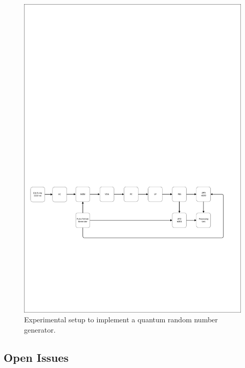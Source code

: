 \begin{figure}[H]
    \centering
        \includegraphics[clip, trim=0.5cm 7cm 0.5cm 17cm, width=1.00\textwidth]{./sdf/qrng/figures_raw/experimental_qrng.pdf}
    \caption{Experimental setup to implement a quantum random number generator.}\label{experimental_qrng}
\end{figure}


\subsection{Open Issues}


\newpage




\cleardoublepage
